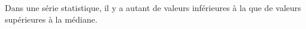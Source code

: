 Dans une série statistique, il y a autant de valeurs inférieures à la 
que de valeurs supérieures à la médiane.